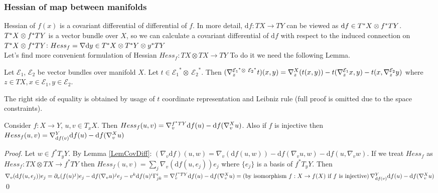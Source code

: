 \documentclass{llncs}
\newcommand{\partderiv}[2]{\partial_{#2} {#1}}
\newcommand{\CovariantDerivManif}[2]{\tensor*{\nabla}{^{#1}_{#2}}}
\newcommand{\CovariantDiff}{\nabla}
\newcommand{\CovariantDeriv}[1]{\nabla_{#1}}
\newcommand{\Diff}{\mathrm{d}}
\newcommand{\TangentSpaceArg}[2]{{T_{#2}}{#1}}
\newcommand{\TangentBundle}[1]{T{#1}}
\newcommand{\CotangentBundle}[1]{\tensor*{T}{^{*}}{#1}}
\newcommand {\Preimage}[2]{{#2}^*{#1}}
\newcommand \TArgPreimage[3]{\Preimage{\TangentSpaceArg{#1}{#2}}{#3}}
\newcommand \TPreimage[2]{\Preimage{\TangentBundle{#1}}{#2}}
\newcommand {\DiffSpace}[3]{\CotangentBundle{#1}\otimes \TPreimage{#2}{#3}}
\newcommand {\HessianSpace}[3]{\CotangentBundle{#1}\otimes \CotangentBundle{#2}\otimes \TPreimage{#2}{#3}}
\newcommand {\bigeps}{\mathcal{E}}
\begin{document}
\subsubsection{Hessian of map between manifolds}
Hessian of $f(x)$ is a covariant differential of differential of $f$. In more detail, $\Diff f:TX\to TY$ can be viewed as $\Diff f \in \DiffSpace{X}{Y}{f}$.
$\DiffSpace{X}{Y}{f}$ is a vector bundle over $X$, so we can calculate a covariant differential of $\Diff f$ with respect to the induced connection on $\DiffSpace{X}{Y}{f}$: $Hess_f=\CovariantDiff \Diff y \in \HessianSpace{X}{Y}{y}$
\\
Let's find more convenient formulation of Hessian $Hess_f:\TangentBundle{X}\otimes\TangentBundle{X}\to \TangentBundle{Y}$
To do it we need the following Lemma.
\begin{lemma} \label{LemCovDiff}
Let $\bigeps_1$, $\bigeps_2$ be vector bundles over manifold $X$. 
Let $t \in {\bigeps_1}^* \otimes \ {\bigeps_2}^*$. Then
$(\CovariantDerivManif{{\bigeps_1}^* \otimes \ {\bigeps_2}^*}{z}{t})(x, y) = 
\CovariantDerivManif{X}{z}{(t(x, y))} -
t(\CovariantDerivManif{\bigeps_1}{z}{x}, y) - 
t(x, \CovariantDerivManif{\bigeps_2}{z}{y})$
where $z \in TX, x \in \bigeps_1, y \in \bigeps_2$. 
\end{lemma}
The right side of equality is obtained by usage of $t$ coordinate representation and Leibniz rule (full proof is omitted due to the space constraints).

\begin{lemma} \label{LemHessian}
Consider $f:X\to Y$, $u, v\in T_x X$. Then
$Hess_f(u,v)=\CovariantDerivManif{\TPreimage{Y}{f}} {v} \Diff f(u) - 
							\Diff f( 
							\CovariantDerivManif{X}{v}u
							)$. Also if $f$ is injective then
$Hess_f(u,v)=\CovariantDerivManif{Y}{ \Diff f(v)} \Diff f(u) - 
							\Diff f( 
							\CovariantDerivManif{X}{v}u
							)$
\end{lemma}

\begin{proof}
Let $w\in \TArgPreimage{Y}{y}{f}$. By Lemma \ref{LemCovDiff}: 
$(\CovariantDeriv{v} \Diff f)(u, w) = \CovariantDeriv{v}{(\Diff f(u, w))} - \Diff f(\CovariantDeriv{v}{u}, w) - \Diff f({u}, \CovariantDeriv{v}{w})$.
If we treat $Hess_f$ as $Hess_f:\TangentBundle{X}\otimes\TangentBundle{X}\to \TPreimage{Y}{f}$ 
then $Hess_f(u, v)= \sum_{j} \CovariantDeriv{v}{(\Diff f(u, e_j))} e_j$ where $\{e_j\}$ is a basis of $\TArgPreimage{Y}{y}{f}$. Then
$\CovariantDeriv{v}{(\Diff f(u, e_j))} e_j = \partderiv{(f(u)^j)}{v} e_j - \Diff f(\CovariantDeriv{v}{u})^j e_j - v^k \Diff f(u)^i \tensor*{\Gamma}{^i_j_k}= 
\CovariantDerivManif{\TPreimage{Y}{f}} {v} \Diff f(u) - 
							\Diff f( 
							\CovariantDerivManif{X}{v}u
							) = 
							\textrm{(by isomorphism }f:X\to f(X) \textrm{ if } f \textrm{ is injective)}\,
							\CovariantDerivManif{Y} {\Diff f(v)} \Diff f(u) - 
							\Diff f( 
							\CovariantDerivManif{X}{v}u )$
\qed 
\end{proof}
\end{document}
